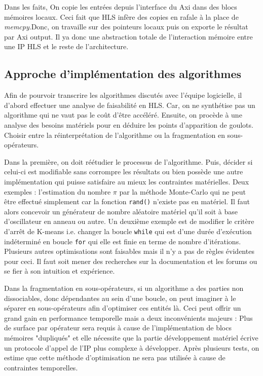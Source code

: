 \documentclass[12pt,a4paper]{ieee}
\begin{document}
Dans les faits, On copie les entrées depuis l'interface du Axi dans des blocs mémoires locaux. Ceci fait que HLS infère des copies en rafale à la place de \textit{memcpy}.Donc, on travaille sur des pointeurs locaux puis on exporte le résultat par Axi output. Il ya donc une abstraction totale de l'interaction mémoire entre une IP HLS et le reste de l'architecture.

\subsection{Approche d'implémentation des algorithmes}
Afin de pourvoir transcrire les algorithmes discutés avec l'équipe logicielle, il d'abord effectuer une analyse de faisabilité en HLS. Car, on ne synthétise  pas un algorithme qui ne vaut pas le coût d'être accéléré. Ensuite, on procède à une analyse des besoins matériels pour en déduire les points d'apparition de goulots. Choisir entre la réinterprétation de l'algorithme ou la fragmentation en sous-opérateurs. 

Dans la première, on doit réétudier le processus de l'algorithme. Puis, décider si celui-ci est modifiable sans corrompre les résultats ou bien possède une autre implémentation qui puisse satisfaire au mieux les contraintes matérielles. Deux exemples : l'estimation du nombre $\pi$ par la méthode Monte-Carlo qui ne peut être effectué simplement car la fonction \texttt{rand()} n'existe pas en matériel. Il faut alors concevoir un générateur de nombre aléatoire matériel qu'il soit à base d'oscillateur en anneau ou autre. Un deuxième exemple est de modifier le critère d'arrêt de K-means i.e. changer la boucle \texttt{while} qui est d'une durée d'exécution indéterminé en boucle \texttt{for} qui elle est finie en terme de nombre d'itérations. Plusieurs autres optimisations sont faisables mais il n'y a pas de règles évidentes pour ceci. Il faut soit mener des recherches sur la documentation et les forums ou se fier à son intuition et expérience.

Dans la fragmentation en sous-opérateurs, si un algorithme a des parties non dissociables, donc dépendantes au sein d'une boucle, on peut imaginer à le séparer en sous-opérateurs afin d'optimiser ces entités là. Ceci peut offrir un grand gain en performance temporelle mais a deux inconvénients majeurs : Plus de surface par opérateur sera requis à cause de l'implémentation de blocs mémoires "dupliqués" et elle nécessite que la partie développement matériel écrive un protocole d'appel de l'IP plus complexe à développer. Après plusieurs tests, on estime que cette méthode d'optimisation ne sera pas utilisée à cause de contraintes temporelles.
\end{document}
